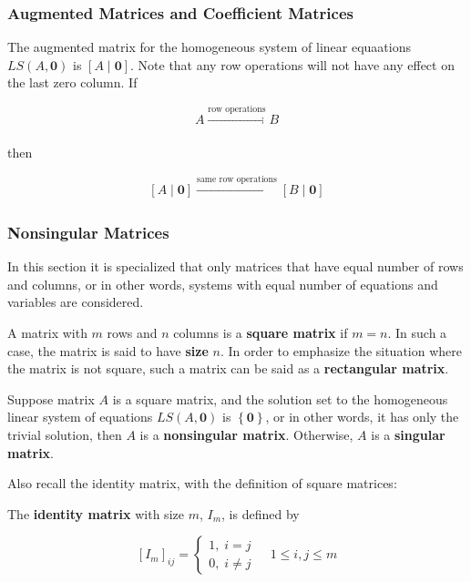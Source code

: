 \documentclass[a4paper,12pt]{article}
\begin{document}
\subsubsection{Augmented Matrices and Coefficient Matrices}
The augmented matrix for the homogeneous system of linear equaations $LS(A,\mathbf{0})$ is $[A\!\mid\!\mathbf{0}]$. Note that any row operations will not have any effect on the last zero column. If

$$A\xrightarrow[ ]{\text{row operations}}B$$\s

then

$$[A\!\mid\!\mathbf{0}]\xrightarrow[ ]{\text{same row operations}}[B\!\mid\!\mathbf{0}]$$

\subsubsection{Nonsingular Matrices}
In this section it is specialized that only matrices that have equal number of rows and columns, or in other words, systems with equal number of equations and variables are considered.\n

\begin{dft}
  A matrix with $m$ rows and $n$ columns is a \textbf{square matrix} if $m=n$. In such a case, the matrix is said to have \textbf{size} $n$. In order to emphasize the situation where the matrix is not square, such a matrix can be said as a \textbf{rectangular matrix}.
\end{dft}\n

\begin{dft}
  Suppose matrix $A$ is a square matrix, and the solution set to the homogeneous linear system of equations $LS(A,\mathbf{0})$ is $\left\{ \mathbf{0}\right\}$, or in other words, it has only the trivial solution, then $A$ is a \textbf{nonsingular matrix}. Otherwise, $A$ is a \textbf{singular matrix}.
\end{dft}\n

Also recall the identity matrix, with the definition of square matrices:\n

\begin{dft}
  The \textbf{identity matrix} with size $m$, $I_{m}$, is defined by

  $$[I_{m}]_{ij}=\begin{cases}
    1,\; i=j\\
    0,\; i\neq j
   \end{cases}\;\;\;\; 1\leq i,j\leq m$$
\end{dft}\n
\end{document}
